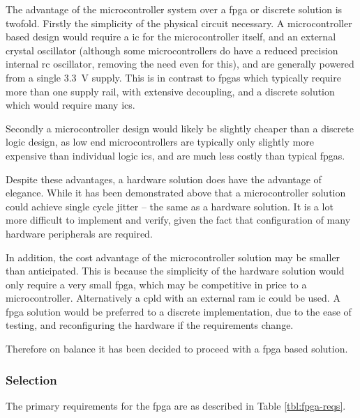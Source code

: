 
The advantage of the microcontroller system over a \gls{fpga} or discrete solution is twofold. Firstly the simplicity of the physical circuit necessary. A microcontroller based design would require a \gls{ic} for the microcontroller itself, and an external crystal oscillator (although some microcontrollers do have a reduced precision internal \gls{rc} oscillator, removing the need even for this), and are generally powered from a single \SI{3.3}{\volt} supply. This is in contrast to \glspl{fpga} which typically require more than one supply rail, with extensive decoupling, and a discrete solution which would require many \glspl{ic}.

Secondly a microcontroller design would likely be slightly cheaper than a discrete logic design, as low end microcontrollers are typically only slightly more expensive than individual logic \glspl{ic}, and are much less costly than typical \glspl{fpga}.

Despite these advantages, a hardware solution does have the advantage of elegance. While it has been demonstrated above that a microcontroller solution could achieve single cycle jitter -- the same as a hardware solution. It is a lot more difficult to implement and verify, given the fact that configuration of many hardware peripherals are required.

In addition, the cost advantage of the microcontroller solution may be smaller than anticipated. This is because the simplicity of the hardware solution would only require a very small \gls{fpga}, which may be competitive in price to a microcontroller. Alternatively a \gls{cpld} with an external \gls{ram} \gls{ic} could be used. A \gls{fpga} solution would be preferred to a discrete implementation, due to the ease of testing, and reconfiguring the hardware if the requirements change.

Therefore on balance it has been decided to proceed with a \gls{fpga} based solution.

\subsubsection{ Selection}

The primary requirements for the \gls{fpga} are as described in Table \ref{tbl:fpga-reqs}.

